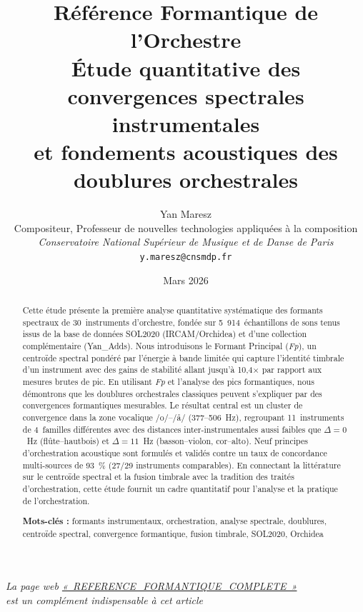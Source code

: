 \documentclass[12pt,a4paper]{article}
\title{%
  \textbf{Référence Formantique de l'Orchestre}\\[6pt]
  \large Étude quantitative des convergences spectrales instrumentales\\
  et fondements acoustiques des doublures orchestrales%
}
\author{%
  Yan Maresz\\
  Compositeur, Professeur de nouvelles technologies appliquées à la composition\\
  \textit{Conservatoire National Supérieur de Musique et de Danse de Paris}\\
  \texttt{y.maresz@cnsmdp.fr}%
}
\date{Mars 2026}
\begin{document}
\maketitle

\begin{center}
\small
\textit{La page web
\href{https://zseramnay.github.io/Orchestration/Etude-Formants/Versions-html-and-docx/REFERENCE_FORMANTIQUE_COMPLETE.html}{«~REFERENCE\_FORMANTIQUE\_COMPLETE~»} \\
est un complément indispensable à cet article}
\end{center}
\vspace{1cm}


\begin{abstract}
Cette étude présente la première analyse quantitative systématique des formants
spectraux de 30~instruments d'orchestre, fondée sur 5~914~échantillons de sons tenus
issus de la base de données SOL2020 (IRCAM/Orchidea) et d'une collection complémentaire
(Yan\_Adds). Nous introduisons le Formant Principal (\textit{Fp}), un centroïde spectral
pondéré par l'énergie à bande limitée qui capture l'identité timbrale d'un instrument
avec des gains de stabilité allant jusqu'à 10,4$\times$ par rapport aux mesures
brutes de pic. En utilisant \textit{Fp} et l'analyse des pics formantiques, nous
démontrons que les doublures orchestrales classiques peuvent s'expliquer par des
convergences formantiques mesurables. Le résultat central est un cluster de convergence
dans la zone vocalique /o/--/\aa/ (377--506~Hz), regroupant 11~instruments de
4~familles différentes avec des distances inter-instrumentales aussi faibles que
$\Delta = 0$~Hz (flûte--hautbois) et $\Delta = 11$~Hz (basson--violon, cor--alto).
Neuf principes d'orchestration acoustique sont formulés et validés contre un taux de
concordance multi-sources de 93~\% (27/29 instruments comparables). En connectant la
littérature sur le centroïde spectral et la fusion timbrale \citep{Sandell1995,Tardieu2012,Goodchild2018}
avec la tradition des traités d'orchestration, cette étude fournit un cadre quantitatif
pour l'analyse et la pratique de l'orchestration.

\medskip
\noindent\textbf{Mots-clés :} formants instrumentaux, orchestration, analyse spectrale,
doublures, centroïde spectral, convergence formantique, fusion timbrale, SOL2020, Orchidea
\end{abstract}
\end{document}
